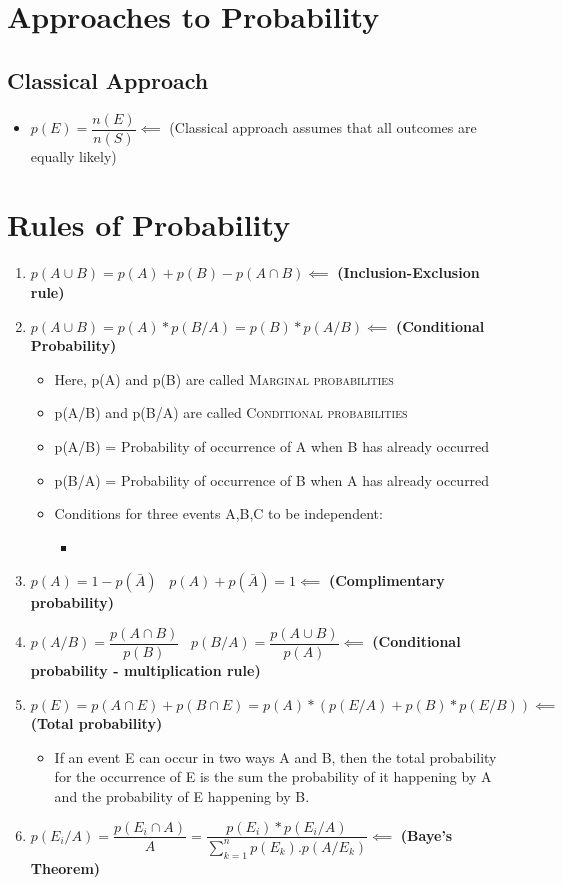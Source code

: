 \documentclass[8pt]{report}
\begin{document}
\section{Approaches to Probability}
	\subsection{Classical Approach}
		\begin{itemize}
			\item $\boxed{p(E) = \dfrac{n(E)}{n(S)}}\impliedby$ (Classical approach assumes that all outcomes are equally likely)
		\end{itemize}\hrulefill
\section{Rules of Probability}
	\begin{enumerate}
		\item $\boxed{p(A\cup B)=p(A)+p(B)-p(A\cap B)}\impliedby$ \textbf{(Inclusion-Exclusion rule)}
		\item $\boxed{p(A\cup B) = p(A)*p(B/A) = p(B)*p(A/B)\impliedby}$ \textbf{(Conditional Probability)}
			\begin{itemize}
				\item Here, p(A) and p(B) are called \textsc{Marginal probabilities}
				\item p(A/B) and p(B/A) are called \textsc{Conditional probabilities}
				\item p(A/B) = Probability of occurrence of A when B has already occurred
				\item p(B/A) = Probability of occurrence of B when A has already occurred
				\item Conditions for three events A,B,C to be independent:
					\begin{itemize}
						\item {}   
					\end{itemize}
			\end{itemize}
		\item $\boxed{p(A)=1-p(\bar{A})}\;\;\;\boxed{p(A)+p(\bar{A})=1}\impliedby$ \textbf{(Complimentary probability)}
		\item $\boxed{p(A/B)=\dfrac{p(A\cap B)}{p(B)}}\;\;\;\boxed{p(B/A)=\dfrac{p(A\cup B)}{p(A)}}\impliedby$ \textbf{(Conditional probability - multiplication rule)}
		\item $\boxed{p(E) = p(A\cap E)+p(B\cap E) = p(A)*(p(E/A)+p(B)*p(E/B))}\impliedby$ \textbf{(Total probability)}
			\begin{itemize}
				\item If an event E can occur in two ways A and B, then the total probability for the occurrence of E is the sum the probability of it happening by A and the probability of E happening by B.
			\end{itemize}
		\item $\boxed{p\left(E_i/A\right) = \dfrac{p(E_i\cap A)}{A} = \dfrac{p(E_i)*p(E_i/A)}{\sum_{k=1}^{n}p(E_k).p(A/E_k)}} \impliedby$ \textbf{(Baye's Theorem)}
	\end{enumerate}\hrulefill
\end{document}
